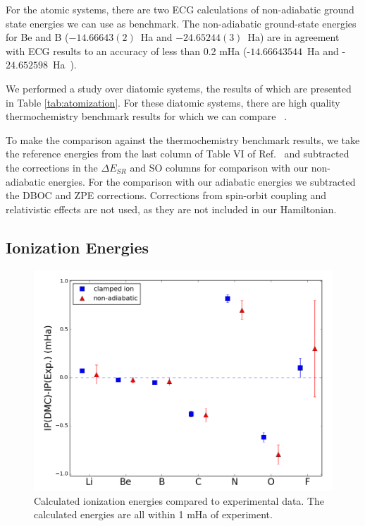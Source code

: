 \documentclass[pra,superscriptaddress,groupedaddress,twocolumn]{revtex4}
\begin{document}
 For the atomic systems, there are two ECG calculations of non-adiabatic ground state energies we can use as benchmark.  The non-adiabatic ground-state energies for Be and B ($-14.66643(2)$~Ha and $-24.65244(3)$~Ha) are in agreement with ECG results  to an accuracy of less than 0.2 mHa (-$14.66643544$~Ha \cite{Bubin_BeH_noBO} and -$24.652598$~Ha~\cite{Bubin_BH_noBO}).

We performed a study over diatomic systems, the results of which are presented in Table \ref{tab:atomization}. For these diatomic systems, there are high quality thermochemistry benchmark results for which we can compare ~\cite{Feller_Corrections}. 

To make the comparison against the thermochemistry benchmark results, we take the reference energies from the last column of Table VI of Ref.~\cite{Feller_Corrections} and subtracted the corrections in the $\Delta E_{SR}$ and SO columns for comparison with our non-adiabatic energies.  For the comparison with our adiabatic energies we subtracted the DBOC and ZPE corrections.  Corrections from spin-orbit coupling and relativistic effects are not used, as they are not included in our Hamiltonian.

\subsection{Ionization Energies}

\begin{figure}[h]
\centering
\includegraphics[scale=.4]{Figures/ionization}
\caption{Calculated ionization energies compared to experimental data. The calculated energies are all within 1 mHa of experiment.}
\end{figure}
\end{document}
